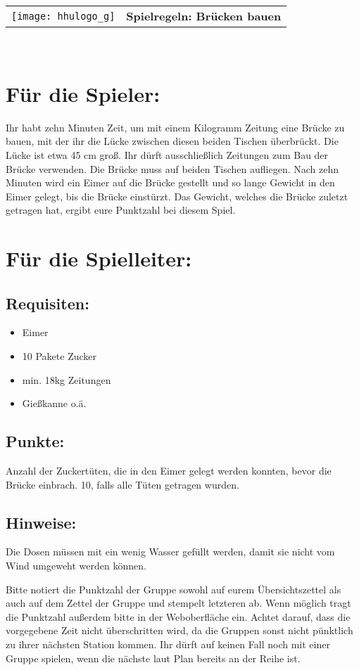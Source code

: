 \documentclass[a4paper,10pt]{article}
\def\spiela{Brücken bauen}
\newcommand{\unten}{
 Bitte notiert die Punktzahl der Gruppe sowohl auf eurem Übersichtszettel als auch auf dem Zettel der Gruppe und stempelt letzteren ab. Wenn möglich tragt die Punktzahl außerdem bitte in der Weboberfläche ein.
 Achtet darauf, dass die vorgegebene Zeit nicht überschritten wird, da die Gruppen sonst nicht pünktlich zu ihrer nächsten Station kommen. Ihr dürft auf keinen Fall noch mit einer Gruppe spielen, wenn die nächste laut Plan bereits an der Reihe ist.
}
\begin{document}

  \begin{tabularx}{\textwidth}{lc}
    \texttt{[image: hhulogo\_g]}
  & {\Huge \textbf{Spielregeln: \spiela}}
  \end{tabularx}\\

\Large
\section*{Für die Spieler:} 
Ihr habt zehn Minuten Zeit, um mit einem Kilogramm Zeitung eine Brücke zu bauen, mit der ihr die Lücke zwischen diesen beiden Tischen überbrückt. Die Lücke ist etwa 45 cm groß. Ihr dürft ausschließlich Zeitungen zum Bau der Brücke verwenden. Die Brücke muss auf beiden Tischen aufliegen. Nach zehn Minuten wird ein Eimer auf die Brücke gestellt und so lange Gewicht in den Eimer gelegt, bis die Brücke einstürzt. Das Gewicht, welches die Brücke zuletzt getragen hat, ergibt eure Punktzahl bei diesem Spiel. 

\section*{Für die Spielleiter:}
\subsection*{Requisiten:}
\begin{itemize}
 \item Eimer
 \item 10 Pakete Zucker
 \item min. 18kg Zeitungen
 \item Gießkanne o.ä.
\end{itemize}
\subsection*{Punkte:}
Anzahl der Zuckertüten, die in den Eimer gelegt werden konnten, bevor die Brücke einbrach. 10, falls alle Tüten getragen wurden.

\subsection*{Hinweise:}  
Die Dosen müssen mit ein wenig Wasser gefüllt werden, damit sie nicht vom Wind umgeweht werden können.
\unten

\newpage

\end{document}
